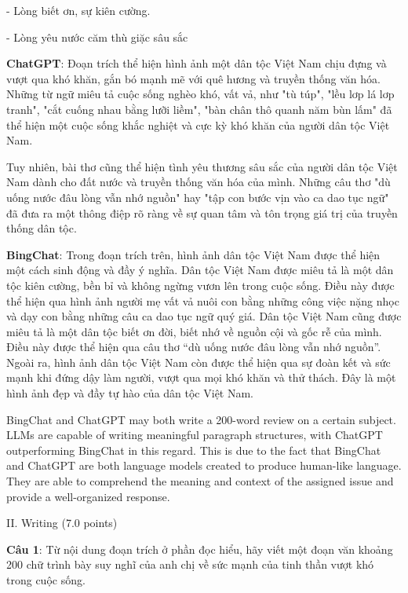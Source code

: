 \documentclass{article}
\begin{document}
{\begin{mdframed}[linewidth=1pt,linecolor=red]
		- Lòng biết ơn, sự kiên cường.
		
		- Lòng yêu nước căm thù giặc sâu sắc
		
		\textbf{ChatGPT}: Đoạn trích thể hiện hình ảnh một dân tộc Việt Nam chịu đựng và vượt qua khó khăn, gắn bó mạnh mẽ với quê hương và truyền thống văn hóa. Những từ ngữ miêu tả cuộc sống nghèo khó, vất vả, như "tù túp", "lều lơp lá lơp tranh", "cắt cuống nhau bằng lưỡi liềm", "bàn chân thô quanh năm bùn lấm" đã thể hiện một cuộc sống khắc nghiệt và cực kỳ khó khăn của người dân tộc Việt Nam.
		
		Tuy nhiên, bài thơ cũng thể hiện tình yêu thương sâu sắc của người dân tộc Việt Nam dành cho đất nước và truyền thống văn hóa của mình. Những câu thơ "dù uống nước đâu lòng vẫn nhớ nguồn" hay "tập con bước vịn vào ca dao tục ngữ" đã đưa ra một thông điệp rõ ràng về sự quan tâm và tôn trọng giá trị của truyền thống dân tộc.
		
		\textbf{BingChat}: Trong đoạn trích trên, hình ảnh dân tộc Việt Nam được thể hiện một cách sinh động và đầy ý nghĩa. Dân tộc Việt Nam được miêu tả là một dân tộc kiên cường, bền bỉ và không ngừng vươn lên trong cuộc sống. Điều này được thể hiện qua hình ảnh người mẹ vất vả nuôi con bằng những công việc nặng nhọc và dạy con bằng những câu ca dao tục ngữ quý giá. Dân tộc Việt Nam cũng được miêu tả là một dân tộc biết ơn đời, biết nhớ về nguồn cội và gốc rễ của mình. Điều này được thể hiện qua câu thơ “dù uống nước đâu lòng vẫn nhớ nguồn”. Ngoài ra, hình ảnh dân tộc Việt Nam còn được thể hiện qua sự đoàn kết và sức mạnh khi đứng dậy làm người, vượt qua mọi khó khăn và thử thách. Đây là một hình ảnh đẹp và đầy tự hào của dân tộc Việt Nam.
	\end{mdframed}
	
	BingChat and ChatGPT may both write a 200-word review on a certain subject. LLMs are capable of writing meaningful paragraph structures, with ChatGPT outperforming BingChat in this regard. This is due to the fact that BingChat and ChatGPT are both language models created to produce human-like language. They are able to comprehend the meaning and context of the assigned issue and provide a well-organized response.
	
	
	
	\begin{mdframed}[linewidth=1pt,linecolor=red] 
		II. Writing (7.0 points)
		
\textbf{Câu 1}: Từ nội dung đoạn trích ở phần đọc hiểu, hãy viết một đoạn văn khoảng 200 chữ trình bày suy nghĩ của anh chị về sức mạnh của tinh thần vượt khó trong cuộc sống.
		

\end{mdframed}}
\end{document}
